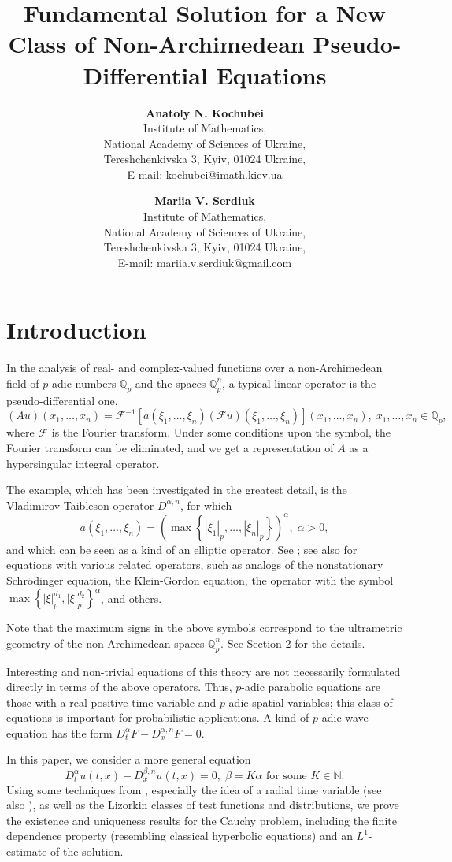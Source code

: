 \documentclass[14pt]{article}
\title{Fundamental Solution for a New Class of Non-Archimedean Pseudo-Differential Equations}
\author{\textbf{Anatoly N. Kochubei}\\
\footnotesize Institute of Mathematics,\\
\footnotesize National Academy of Sciences of Ukraine,\\
\footnotesize Tereshchenkivska 3, Kyiv, 01024 Ukraine,\\
\footnotesize E-mail: kochubei@imath.kiev.ua
\and
\textbf{Mariia V. Serdiuk}\\
\footnotesize Institute of Mathematics,\\
\footnotesize National Academy of Sciences of Ukraine,\\
\footnotesize Tereshchenkivska 3, Kyiv, 01024 Ukraine,\\
\footnotesize E-mail: mariia.v.serdiuk@gmail.com }
\theoremstyle{theorem}
\theoremstyle{theorem}
\theoremstyle{definition}
\theoremstyle{lemma}
\numberwithin{equation}{section}
\begin{document}
\maketitle

\section{Introduction}

In the analysis of real- and complex-valued functions over a non-Archimedean field of $p$-adic numbers $\mathbb{Q}_p$ and the spaces $\mathbb{Q}_p^n$, a typical linear operator is the pseudo-differential one,
$$(Au)(x_1,\dots,x_n)=\mathcal{F}^{-1}\left[a(\xi_1,\dots,\xi_n)(\mathcal{F}u)(\xi_1,\dots,\xi_n)\right](x_1,\dots,x_n),\;x_1,\dots,x_n\in\mathbb{Q}_p,$$
where $\mathcal{F}$ is the Fourier transform. Under some conditions upon the symbol, the Fourier transform can be eliminated, and we get a representation of $A$ as a hypersingular integral operator.

The example, which has been investigated in the greatest detail, is the Vladimirov-Taibleson operator $D^{\alpha,n}$, for which
$$a(\xi_1,\dots,\xi_n)=\left(\max\left\{|\xi_1|_p,\dots,|\xi_n|_p\right\}\right)^{\alpha},\;\alpha>0,$$
and which can be seen as a kind of an elliptic operator. See \cite{VVZ,K2023}; see also \cite{Z,G-C} for equations with various related operators, such as analogs of the nonstationary Schrödinger equation, the Klein-Gordon equation, the operator with the symbol $\max\left\{|\xi|_p^{d_1},|\xi|_p^{d_2}\right\}^{\alpha}$, and others.

Note that the maximum signs in the above symbols correspond to the ultrametric geometry of the non-Archimedean spaces $\mathbb{Q}_p^n$. See Section 2 for the details.

Interesting and non-trivial equations of this theory are not necessarily formulated directly in terms of the above operators. Thus, $p$-adic parabolic equations are those with a real positive time variable and $p$-adic spatial variables; this class of equations is important for probabilistic applications. A kind of $p$-adic wave equation \cite{K2008} has the form $D_t^{\alpha}F-D_x^{\alpha,n}F=0$.

In this paper, we consider a more general equation
$$D_t^{\alpha}u(t,x)-D_x^{\beta,n}u(t,x)=0,\;\beta=K\alpha\mbox{ for some }K\in\mathbb{N}.$$
Using some techniques from \cite{K2008}, especially the idea of a radial time variable (see also \cite{K2014}), as well as the Lizorkin classes of test functions and distributions, we prove the existence and uniqueness results for the Cauchy problem, including the finite dependence property (resembling classical hyperbolic equations) and an $L^1$-estimate of the solution.
\end{document}
